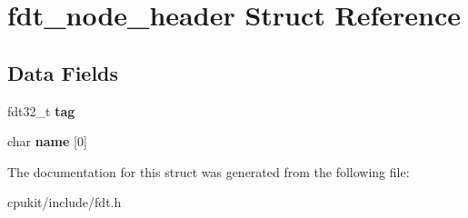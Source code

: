 \hypertarget{structfdt__node__header}{}\section{fdt\+\_\+node\+\_\+header Struct Reference}
\label{structfdt__node__header}
\subsection*{Data Fields}
\begin{DoxyCompactItemize}
\item 
\mbox{\label{structfdt__node__header_a073164a8ce430c15d2147ccba6bc7340}} 
fdt32\+\_\+t {\bfseries tag}
\item 
\mbox{\label{structfdt__node__header_aab823ddad5b747d212c38271e73e3388}} 
char {\bfseries name} \mbox{[}0\mbox{]}
\end{DoxyCompactItemize}


The documentation for this struct was generated from the following file\+:\begin{DoxyCompactItemize}
\item 
cpukit/include/fdt.\+h\end{DoxyCompactItemize}
